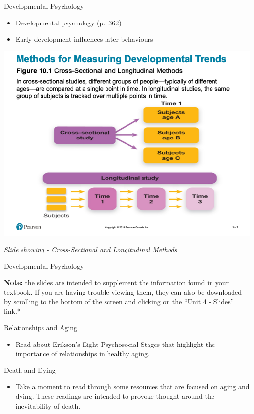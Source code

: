 \documentclass[
]{book}
\providecommand{\tightlist}{%
  \setlength{\itemsep}{0pt}\setlength{\parskip}{0pt}}
\begin{document}
\begin{reflect}
Developmental Psychology

\begin{itemize}
\tightlist
\item
  Developmental psychology (p.~362)\\
\item
  Early development influences later behaviours
\end{itemize}

\includegraphics{assets/unit_4/slide_7.png}

\emph{Slide showing - Cross-Sectional and Longitudinal Methods}

Developmental Psychology

\textbf{Note:} the slides are intended to supplement the information found in your textbook. If you are having trouble viewing them, they can also be downloaded by scrolling to the bottom of the screen and clicking on the ``Unit 4 - Slides'' link.*

{Relationships and Aging}

\begin{itemize}
\tightlist
\item
  Read about Erikson's Eight Psychosocial Stages that highlight the importance of relationships in healthy aging.
\end{itemize}

{Death and Dying}

\begin{itemize}
\tightlist
\item
  Take a moment to read through some resources that are focused on aging and dying. These readings are intended to provoke thought around the inevitability of death.
\end{itemize}


\end{reflect}
\end{document}
